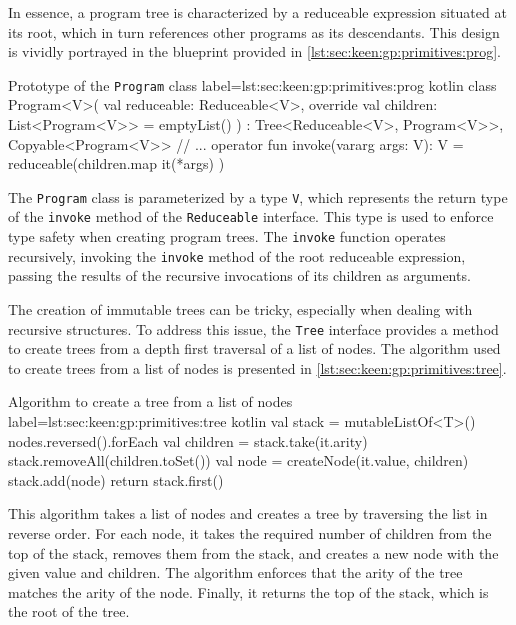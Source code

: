     In essence, a program tree is characterized by a reduceable expression 
    situated at its root, which in turn references other programs as its 
    descendants. This design is vividly portrayed in the blueprint provided in 
    \vref{lst:sec:keen:gp:primitives:prog}.

    \begin{code}{Prototype of the \texttt{Program} class}{
      label=lst:sec:keen:gp:primitives:prog
    }{kotlin}
      class Program<V>(
        val reduceable: Reduceable<V>,
        override val children: List<Program<V>> = emptyList()
      ) : Tree<Reduceable<V>, Program<V>>, Copyable<Program<V>> {
        // ...
        operator fun invoke(vararg args: V): V = reduceable(children.map { it(*args) })
      }
    \end{code}

    The \texttt{Program} class is parameterized by a type \texttt{V}, which
    represents the return type of the \texttt{invoke} method of the
    \texttt{Reduceable} interface. This type is used to enforce type safety
    when creating program trees.
    The \texttt{invoke} function operates recursively, invoking the
    \texttt{invoke} method of the root reduceable expression, passing the
    results of the recursive invocations of its children as arguments.

    The creation of immutable trees can be tricky, especially when dealing with
    recursive structures. To address this issue, the \texttt{Tree} interface
    provides a method to create trees from a depth first traversal of a
    list of nodes. The algorithm used to create trees from a list of nodes is 
    presented in \vref{lst:sec:keen:gp:primitives:tree}.

    \begin{code}{Algorithm to create a tree from a list of nodes}{
      label=lst:sec:keen:gp:primitives:tree
    }{kotlin}
      val stack = mutableListOf<T>()
      nodes.reversed().forEach {
          val children = stack.take(it.arity)
          stack.removeAll(children.toSet())
          val node = createNode(it.value, children)
          stack.add(node)
      }
      return stack.first()
    \end{code}

    This algorithm takes a list of nodes and creates a tree by traversing the
    list in reverse order. For each node, it takes the required number of
    children from the top of the stack, removes them from the stack, and
    creates a new node with the given value and children. The algorithm
    enforces that the arity of the tree matches the arity of the node. Finally,
    it returns the top of the stack, which is the root of the tree.